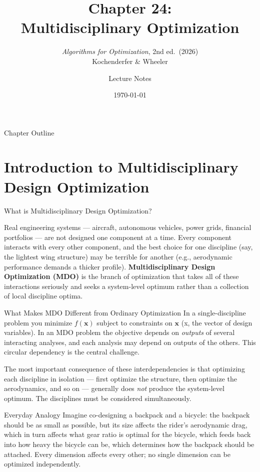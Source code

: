 \documentclass[aspectratio=169,10pt]{beamer}
\title[Ch.\ 24: Multidisciplinary Optimization]{Chapter 24:\\Multidisciplinary Optimization}
\subtitle{\textit{Algorithms for Optimization}, 2nd ed.\ (2026)\\
Kochenderfer \& Wheeler}
\author{Lecture Notes}
\date{\today}
\begin{document}
\begin{frame}
  \titlepage
\end{frame}

\begin{frame}{Chapter Outline}
  \tableofcontents
\end{frame}

\section{Introduction to Multidisciplinary Design Optimization}

\begin{frame}[allowframebreaks]{What is Multidisciplinary Design Optimization?}

  Real engineering systems --- aircraft, autonomous vehicles, power grids,
  financial portfolios --- are not designed one component at a time.
  Every component interacts with every other component, and the best choice
  for one discipline (say, the lightest wing structure) may be terrible for
  another (e.g., aerodynamic performance demands a thicker profile).
  \textbf{Multidisciplinary Design Optimization (MDO)} is the branch of
  optimization that takes all of these interactions seriously and seeks a
  system-level optimum rather than a collection of local discipline optima.

  \begin{block}{What Makes MDO Different from Ordinary Optimization}
    In a single-discipline problem you minimize $f(\mathbf{x})$ subject to
    constraints on $\mathbf{x}$ (x, the vector of design variables).
    In an MDO problem the objective depends on \emph{outputs} of several
    interacting analyses, and each analysis may depend on outputs of the
    others.  This circular dependency is the central challenge.
  \end{block}

  \medskip
  The most important consequence of these interdependencies is that
  optimizing each discipline in isolation --- first optimize the structure,
  then optimize the aerodynamics, and so on --- generally does \emph{not}
  produce the system-level optimum.  The disciplines must be considered
  simultaneously.

  \begin{exampleblock}{Everyday Analogy}
    Imagine co-designing a backpack and a bicycle: the backpack should be
    as small as possible, but its size affects the rider's aerodynamic drag,
    which in turn affects what gear ratio is optimal for the bicycle, which
    feeds back into how heavy the bicycle can be, which determines how the
    backpack should be attached.  Every dimension affects every other;
    no single dimension can be optimized independently.
  \end{exampleblock}


\end{frame}
\end{document}

